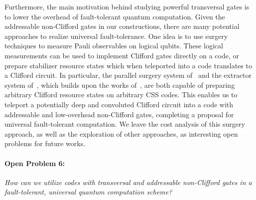 \documentclass[11pt]{article}
\theoremstyle{definition}
\begin{document}
    Furthermore, the main motivation behind studying powerful transversal gates is to lower the overhead of fault-tolerant quantum computation. 
    Given the addressable non-Clifford gates in our constructions, there are many potential approaches to realize universal fault-tolerance. 
    One idea is to use surgery techniques to measure Pauli observables on logical qubits. 
    These logical measurements can be used to implement Clifford gates directly on a code, or prepare stabilizer resource states which when teleported into a code translates to a Clifford circuit.
    In particular, the parallel surgery system of~\cite{cowtan2025parallel} and the extractor system of~\cite{he2025extractors}, which builds upon the works of~\cite{cross2024improved,williamson2024low,swaroop2024universal}, are both capable of preparing arbitrary Clifford resource states on arbitrary CSS codes. 
    This enables us to teleport a potentially deep and convoluted Clifford circuit into a code with addressable and low-overhead non-Clifford gates, completing a proposal for universal fault-tolerant computation. 
    We leave the cost analysis of this surgery approach, as well as the exploration of other approaches, as interesting open problems for future works.

    \paragraph{Open Problem 6:} {\em How can we utilize codes with transversal and addressable non-Clifford gates in a fault-tolerant, universal quantum computation scheme?}
    \\
\end{document}
